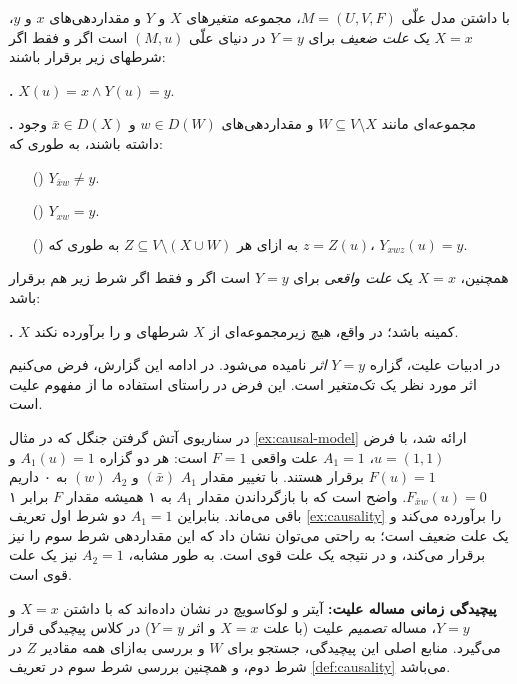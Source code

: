 \begin{definition}\label{def:causality}
  با داشتن مدل علّی
  $M=(U,V,F)$،
  مجموعه متغیرهای
  $X$ و $Y$
  و مقداردهی‌های
  $x$ و $y$،
  $X=x$
  یک
  \textit{علت ضعیف}
  برای
  $Y=y$
  در دنیای علّی
  $(M,u)$
  است اگر و فقط اگر شرطهای زیر برقرار باشند:

  \textbf{.} $X(u)=x \wedge Y(u)=y$.

  \textbf{.}
  مجموعه‌ای مانند
  $W \subseteq V \setminus X$
  و مقداردهی‌های
  $w \in D(W)$ و $\bar{x} \in D(X)$
  وجود داشته باشند، به طوری که:
  \begin{itemize}
    \item[(\lr{a})] $Y_{\bar{x}w} \neq y$.
    \item[(\lr{b})] $Y_{xw}=y$.
    \item[(\lr{c})]
    به ازای هر
    $Z \subseteq V \setminus (X \cup W)$
    به طوری که
    $z = Z(u)$،
    $Y_{xwz}(u)=y$.
  \end{itemize}

  همچنین،
  $X=x$
  یک
  \textit{علت واقعی}
  برای
  $Y=y$
  است اگر و فقط اگر شرط زیر هم برقرار باشد:
  
  \textbf{.} $X$
  کمینه باشد؛ در واقع، هیچ زیرمجموعه‌ای از
  $X$
  شرطهای
   و 
  را برآورده نکند.
\end{definition}

در ادبیات علیت، گزاره
$Y=y$
\textit{اثر}
نامیده می‌شود.
در ادامه این گزارش، فرض می‌کنیم اثر مورد نظر
یک تک‌متغیر است. این فرض در راستای استفاده ما
از مفهوم علیت است.

\begin{example}\label{ex:causality}
  در سناریوی آتش گرفتن جنگل که در مثال
  \ref{ex:causal-model}
  ارائه شد، با فرض
  $u=(1,1)$،
  $A_1=1$
  علت واقعی
  $F=1$
  است: هر دو گزاره
  $A_1(u)=1$ و $F(u)=1$
  برقرار هستند.
  با تغییر مقدار
  $A_1$ $(\bar{x})$ و $A_2$ $(w)$
  به ۰
  داریم
  $F_{\bar{x}w}(u)=0$.
  واضح است که با بازگرداندن مقدار
  $A_1$ به ۱
  همیشه مقدار
  $F$
  برابر ۱ باقی می‌ماند.
  بنابراین
  $A_1=1$
  دو شرط اول تعریف
  \ref{ex:causality}
  را برآورده می‌کند و یک علت ضعیف است؛
  به راحتی می‌توان نشان داد که این مقداردهی
  شرط سوم را نیز برقرار می‌کند،
  و در نتیجه یک علت قوی است.
  به طور مشابه،
  $A_2=1$
  نیز یک علت قوی است.
\end{example}

\textbf{پیچیدگی زمانی مساله علیت:}
آیتر و لوکاسویچ در
\cite{eiter2001complexity}
نشان داده‌اند که با داشتن
$X=x$ و $Y=y$،
مساله
\textit{تصمیم}
علیت
(با علت
$X=x$
و اثر
$Y=y$)
در کلاس پیچیدگی
قرار می‌گیرد. منابع اصلی این پیچیدگی،
جستجو برای
$W$
و بررسی به‌ازای همه مقادیر
$Z$
در شرط دوم، و همچنین بررسی شرط سوم
در تعریف
\ref{def:causality}
می‌باشد.
